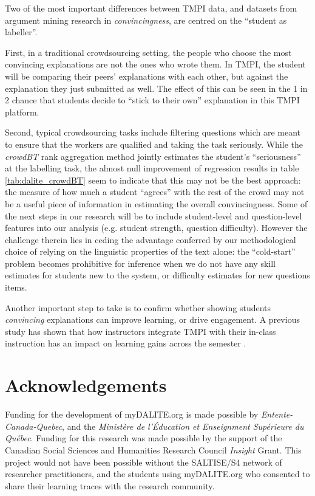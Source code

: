 \documentclass[notitlepage,12pt]{jedm}
\begin{document}
Two of the most important differences between TMPI data, and datasets from 
argument mining research in \textit{convincingness}, are centred on the 
``student as labeller''. 

First, in a traditional crowdsourcing setting, the people who choose the most 
convincing explanations are not the ones who wrote them.
In TMPI, the student will be comparing their peers' explanations with each 
other, but against the explanation they just submitted as well.
The effect of this can be seen in the 1 in 2 chance that students decide to 
``stick to their own'' explanation in this TMPI platform. 

Second, typical crowdsourcing tasks include filtering questions which are meant 
to ensure that the workers are qualified and taking the task seriously.
While the \textit{crowdBT} rank aggregation method jointly estimates the 
student's ``seriousness'' at the labelling task, the almost null improvement of 
regression results in table \ref{tab:dalite_crowdBT} seem to indicate that this 
may not be the best approach: the measure of how much a student ``agrees'' with 
the rest of the crowd may not be a useful piece of information in estimating 
the overall convincingness.
Some of the next steps in our research will be to include student-level and 
question-level features into our analysis (e.g. student strength, question 
difficulty).
However the challenge therein lies in ceding the advantage conferred by our 
methodological choice of relying on the linguistic properties of the text 
alone: the ``cold-start'' problem becomes prohibitive for inference when we do 
not have any skill estimates for students new to the system, or difficulty 
estimates for new questions items. 

Another important step to take is to confirm whether showing students 
\textit{convincing} explanations can improve learning, or drive engagement. 
A previous study has shown that how instructors integrate TMPI with their 
in-class instruction has an impact on learning gains across the semester 
\cite{bhatnagar_analysis_2015}. 



\section{Acknowledgements}
Funding for the development of myDALITE.org is made possible by 
\textit{Entente-Canada-Quebec}, and the \textit{Ministère de l'Éducation et 
Enseignment Supérieure du Québec}. Funding for this research was made possible 
by the support of the Canadian Social Sciences and Humanities Research Council 
\textit{Insight} Grant. This project would not have been possible without the 
SALTISE/S4 network of researcher practitioners, and the students using 
myDALITE.org who consented to share their learning traces with the research 
community.

 




\end{document}
